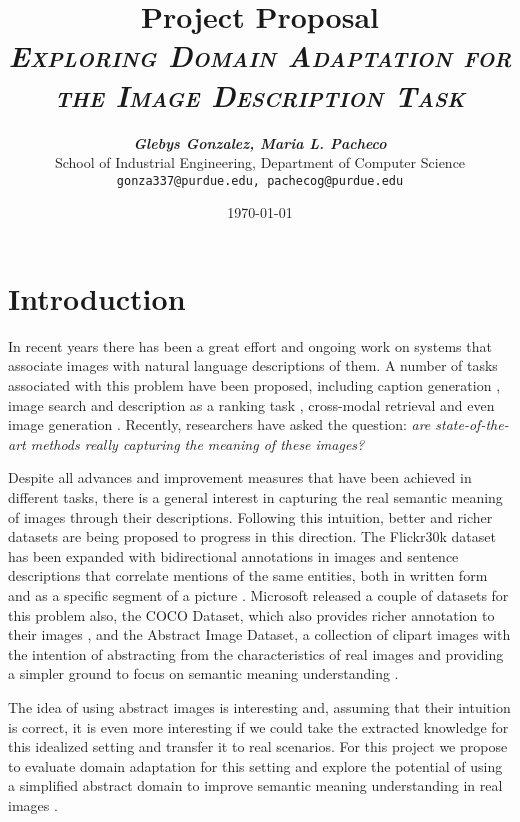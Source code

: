 \documentclass[11pt]{article}
\title{
\textbf{Project Proposal} \\ \textsc{\textit{Exploring Domain Adaptation for the Image Description Task}} \\
}
\author{
	\textbf{\textit{Glebys Gonzalez, Maria L. Pacheco}} \\
	School of Industrial Engineering, Department of Computer Science\\
	\texttt{gonza337@purdue.edu, pachecog@purdue.edu}
}
\date{\today}
\begin{document}
\maketitle


\section{Introduction}


In recent years there has been a great effort and ongoing work on systems that associate images with natural language descriptions of them. A number of tasks associated with this problem have been proposed, including caption generation \cite{DBLP:journals/corr/XuBKCCSZB15} \cite{Chen_2015_CVPR} \cite{DBLP:journals/corr/KarpathyF14}, image search and description as a ranking task \cite{Hodosh:2013:FID:2566972.2566993}, cross-modal retrieval \cite{rasiwasia2010new} \cite{josecp2014role} and even image generation \cite{6751319}. Recently, researchers have asked the question: \textit{are state-of-the-art methods really capturing the meaning of these images?}

Despite all advances and improvement measures that have been achieved in different tasks, there is a general interest in capturing the real semantic meaning of images through their descriptions. Following this intuition, better and richer datasets are being proposed to progress in this direction. The Flickr30k dataset has been expanded with bidirectional annotations in images and sentence descriptions that correlate mentions of the same entities, both in written form and as a specific segment of a picture \cite{DBLP:journals/corr/PlummerWCCHL15}. Microsoft released a couple of datasets for this problem also, the COCO Dataset, which also provides richer annotation to their images \cite{DBLP:journals/corr/LinMBHPRDZ14}, and the Abstract Image Dataset, a collection of clipart images with the intention of abstracting from the characteristics of real images and providing a simpler ground to focus on semantic meaning understanding \cite{Zitnick_2013_ICCV_Workshops}. 

The idea of using abstract images is interesting and, assuming that their intuition is correct, it is even more interesting if we could take the extracted knowledge for this idealized setting and transfer it to real scenarios. For this project we propose to evaluate domain adaptation for this setting and explore the potential of using a simplified abstract domain to improve semantic meaning understanding in real images \cite{DBLP:journals/corr/XuBKCCSZB15} .
\end{document}
